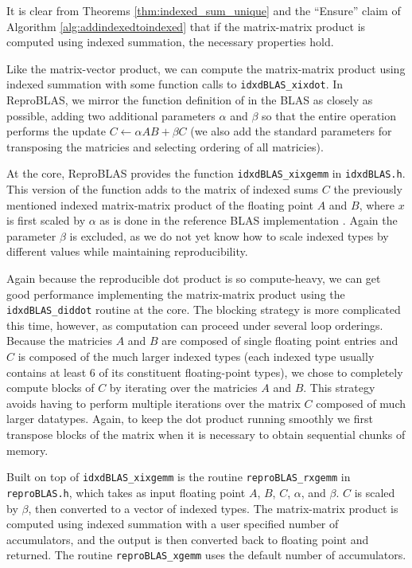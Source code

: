   It is clear from Theorems \ref{thm:indexed_sum_unique} and the ``Ensure'' claim of Algorithm \ref{alg:addindexedtoindexed} that if the matrix-matrix product is computed using indexed summation, the necessary properties hold.

  Like the matrix-vector product, we can compute the matrix-matrix product using indexed summation with some function calls to \texttt{idxdBLAS\_xixdot}. In ReproBLAS, we mirror the function definition of  in the BLAS as closely as possible, adding two additional parameters $\alpha$ and $\beta$ so that the entire operation performs the update $C \gets \alpha AB + \beta C$ (we also add the standard parameters for transposing the matricies and selecting ordering of all matricies).

  At the core, ReproBLAS provides the function \texttt{idxdBLAS\_xixgemm} in \texttt{idxdBLAS.h}. This version of the function adds to the matrix of indexed sums $C$ the previously mentioned indexed matrix-matrix product of the floating point $A$ and $B$, where $x$ is first scaled by $\alpha$ as is done in the reference BLAS implementation \cite{BLAS}. Again the parameter $\beta$ is excluded, as we do not yet know how to scale indexed types by different values while maintaining reproducibility.

  Again because the reproducible dot product is so compute-heavy, we can get good performance implementing the matrix-matrix product using the \texttt{idxdBLAS\_diddot} routine at the core. The blocking strategy is more complicated this time, however, as computation can proceed under several loop orderings. Because the matricies $A$ and $B$ are composed of single floating point entries and $C$ is composed of the much larger indexed types (each indexed type usually contains at least 6 of its constituent floating-point types), we chose to completely compute blocks of $C$ by iterating over the matricies $A$ and $B$. This strategy avoids having to perform multiple iterations over the matrix $C$ composed of much larger datatypes. Again, to keep the dot product running smoothly we first transpose blocks of the matrix when it is necessary to obtain sequential chunks of memory.

  Built on top of \texttt{idxdBLAS\_xixgemm} is the routine \texttt{reproBLAS\_rxgemm} in \texttt{reproBLAS.h}, which takes as input floating point $A$, $B$, $C$, $\alpha$, and $\beta$. $C$ is scaled by $\beta$, then converted to a vector of indexed types. The matrix-matrix product is computed using indexed summation with a user specified number of accumulators, and the output is then converted back to floating point and returned. The routine \texttt{reproBLAS\_xgemm} uses the default number of accumulators.
